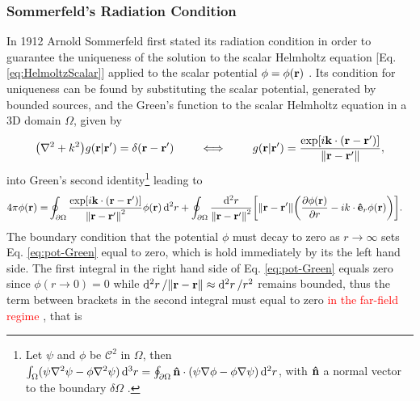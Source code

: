 


\subsubsection{Sommerfeld's Radiation Condition}

In 1912 Arnold Sommerfeld first stated its radiation condition in order to guarantee the uniqueness of the solution to the scalar Helmholtz equation [Eq. \eqref{eq:HelmoltzScalar}] applied to the scalar potential $\phi = \phi(\vb{r})$ \cite{schot_eighty_1992}. Its condition for uniqueness can be found by substituting the scalar potential, generated by bounded sources, and the Green's function to the scalar Helmholtz equation in a 3D domain $\Omega$, given by \cite{zangwill_modern_2013,jackson_classical_1999}
%
%
%
%
%
\begin{align}
    \qty(\nabla^2 + k^2) g(\vb{r}|\vb{r}')   = \delta(\vb{r}-\vb{r}')
        \qquad
        \iff
        \qquad
    g(\vb{r}|\vb{r}')   = \frac{\exp[i\vb{k}\cdot(\vb{r}-\vb{r}')]}{\norm{\vb{r}-\vb{r}'}},
\end{align}
%
into Green's second identity\footnote{%
        Let $\psi$ and $\phi$ be $\mathcal{C}^2$ in $\Omega$, then %
        $\int_\Omega (\psi\nabla^2\psi-\phi\nabla^2\psi)\dd[3]{r} = %
        \oint_{\partial\Omega}\vu{n}\cdot(\psi\nabla\phi-\phi\nabla\psi)\dd[2]{r}$, with $\vu{n}$ a normal vector to the boundary $\delta\Omega$  \cite{zangwill_modern_2013}.} %
 leading to
\begin{align}
    4\pi \phi(\vb{r}) =& \oint_{\partial\Omega}  \frac{\exp[i\vb{k}\cdot(\vb{r}-\vb{r}')]}{\norm{\vb{r}-\vb{r}'}^2} \phi(\vb{r}) \dd[2]{r}+
                 \oint_{\partial\Omega} \frac{\dd[2]{r}}{\norm{\vb{r}-\vb{r}'}^2} \qty[\norm{\vb{r}-\vb{r}'}\qty(\pdv{ \phi(\vb{r})}{r}-ik\cdot\vu{e}_r \phi(\vb{r})) ].
    \label{eq:pot-Green}
\end{align}
%
The boundary condition that the potential $\phi$ must decay to zero as $r\to\infty$ sets Eq. \eqref{eq:pot-Green} equal to zero, which is  hold immediately by its the left hand side. The first integral in the right hand side of Eq. \eqref{eq:pot-Green} equals zero since $\phi(r\to 0 ) = 0$ while $\dd[2]{r}/\norm{\vb{r}-\vb{r}}\approx\dd[2]{r}/r^2$ remains bounded, thus the term between brackets in the second integral must equal to zero \textcolor{red}{in the far-field regime} \cite{schot_eighty_1992}, that is
